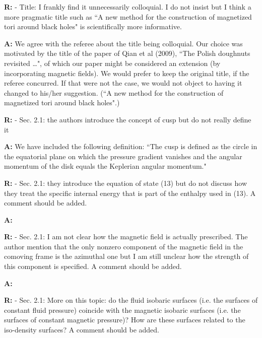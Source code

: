 \documentclass{article}
\begin{document}
\bigskip

{\bf R:} - Title: I frankly find it unnecessarily colloquial. I do not insist but
I think a more pragmatic title such as ``A new method for the
construction of magnetized tori around black holes" is scientifically
more informative.

\bigskip

{\bf A:} We agree with the referee about the title being colloquial. Our choice was
motivated by the title of the paper of Qian et al (2009), ``The Polish 
doughnuts revisited …", of which our paper might be considered an extension 
(by incorporating magnetic fields). We would prefer to keep the original 
title, if the referee concurred. If that were not the case, we would not
object to having it changed to his/her suggestion. (``A new method for the
construction of magnetized tori around black holes".)

\bigskip

{\bf R:} - Sec. 2.1: the authors introduce the concept of cusp but do not really
define it

\bigskip

{\bf A:} We have included the following definition: ``The cusp is defined as the circle 
in the equatorial plane on which the pressure gradient vanishes and the angular 
momentum of the disk equals the Keplerian angular momentum." 

\bigskip

{\bf R:} - Sec. 2.1: they introduce the equation of state (13) but do not discuss
how they treat the specific internal energy that is part of the
enthalpy used in (13). A comment should be added.

\bigskip

{\bf A:}

\bigskip

{\bf R:} - Sec. 2.1: I am not clear how the magnetic field is actually
prescribed. The author mention that the only nonzero component of
the magnetic field in the comoving frame is the azimuthal one but I am
still unclear how the strength of this component is specified. A
comment should be added.

\bigskip

{\bf A:} 

\bigskip

{\bf R:} - Sec. 2.1: More on this topic: do the fluid isobaric surfaces (i.e. the
surfaces of constant fluid pressure) coincide with the magnetic
isobaric surfaces (i.e. the surfaces of constant magnetic pressure)?
How are these surfaces related to the iso-density surfaces? A comment
should be added.
\end{document}
